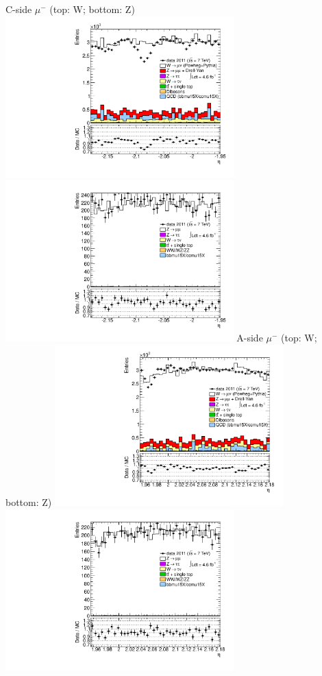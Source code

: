  {
\colb[T]
C-side $\mu^{-}$ (top: W; bottom: Z)
\centering
\includegraphics[width=0.66\textwidth]{dates/20130306/figures/etaphi/Wpt2535_10_C_stack_l_eta_NEG} \\
\includegraphics[width=0.66\textwidth]{dates/20130306/figures/etaphi/Zpt2535_10_C_stack_lN_eta_ALL.pdf}
A-side $\mu^{-}$ (top: W; bottom: Z)
\centering
\includegraphics[width=0.66\textwidth]{dates/20130306/figures/etaphi/Wpt2535_10_A_stack_l_eta_NEG} \\
\includegraphics[width=0.66\textwidth]{dates/20130306/figures/etaphi/Zpt2535_10_A_stack_lN_eta_ALL.pdf} 
\cole
}


